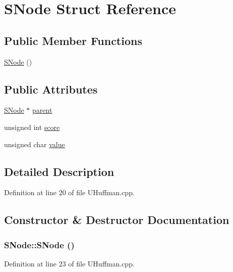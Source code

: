 \hypertarget{struct_s_node}{
\section{SNode Struct Reference}
\label{struct_s_node}
}
\subsection*{Public Member Functions}
\begin{CompactItemize}
\item 
\hyperlink{struct_s_node_747ebe0b867eba254743b863ad2d9a8e}{SNode} ()
\end{CompactItemize}
\subsection*{Public Attributes}
\begin{CompactItemize}
\item 
\hyperlink{struct_s_node}{SNode} $\ast$ \hyperlink{struct_s_node_34a7a4584233ff71a079c7cc8af0d540}{parent}
\item 
unsigned int \hyperlink{struct_s_node_fdf34ae214ee5ba96cbdefd552dfbd67}{score}
\item 
unsigned char \hyperlink{struct_s_node_2089f30eda8aa96bbde23af8e2aa53d2}{value}
\end{CompactItemize}


\subsection{Detailed Description}


Definition at line 20 of file UHuffman.cpp.

\subsection{Constructor \& Destructor Documentation}
\hypertarget{struct_s_node_747ebe0b867eba254743b863ad2d9a8e}{
\subsubsection[{SNode}]{\setlength{\rightskip}{0pt plus 5cm}SNode::SNode ()}}
\label{struct_s_node_747ebe0b867eba254743b863ad2d9a8e}




Definition at line 23 of file UHuffman.cpp.

